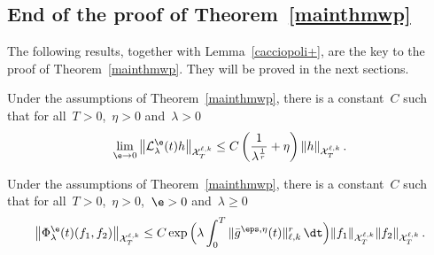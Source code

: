 \subsection{End of the proof of Theorem~\ref{mainthmwp}}

The following results, together with Lemma~\ref{cacciopoli+}, are the key to the proof of Theorem~\ref{mainthmwp}. They will be proved in the next sections.

\begin{prop}\label{linear}
Under the assumptions of Theorem~\ref{mainthmwp}, there is a constant~$C$ such that for all~$T>0$,~$\eta>0$ and~$\lambda>0$
\[
\lim_{\e \to 0} \left\| \mathcal{L}_\lambda^{\e}(t) h \right\|_{\mathcal{X}_T^{\ell,k}} \leq C\left(
\frac1{\lambda^\frac1r } + \eta\right)\| h \|_{\mathcal{X}_T^{\ell,k}}\,.
\]
\end{prop}

\begin{prop}\label{nonlinear}
Under the assumptions of Theorem~\ref{mainthmwp}, there is a constant~$C$ such that for all~$T>0$,~$\eta>0$,~$\e>0$ and~$\lambda\geq0$
\[
\big\| \Phi_\lambda^{\e}(t) (f_1,f_2)\big\|_{\mathcal{X}_T^{\ell,k} } \leq C
\exp \Big(\lambda \int_0^T {\|\bar g^{\eps,\eta}(t)\|_{\ell,k}^r}\, \dt \Big)
\| f_1 \|_{\mathcal{X}_T^{\ell,k}} \| f_2 \|_{\mathcal{X}_T^{\ell,k}} \,.
\]
\end{prop}

